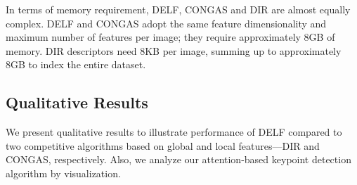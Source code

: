 \documentclass[10pt,twocolumn,letterpaper]{article}
\begin{document}
In terms of memory requirement, DELF, CONGAS and DIR are almost equally complex.
DELF and CONGAS adopt the same feature dimensionality and maximum number of features per image; they require approximately 8GB of memory.
DIR descriptors need 8KB per image, summing up to approximately 8GB to index the entire dataset.

\subsection{Qualitative Results} \label{sub:qualitative}

We present qualitative results to illustrate performance of DELF compared to two competitive algorithms based on global and local features---DIR and CONGAS, respectively.
Also, we analyze our attention-based keypoint detection algorithm by visualization.


\vspace{-5pt}
\end{document}
